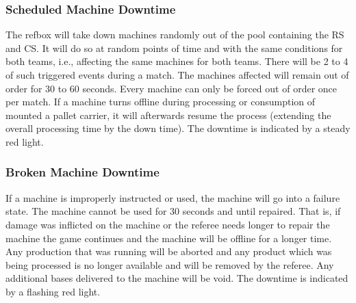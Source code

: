 \documentclass[12pt,twoside]{article}
\begin{document}
\subsubsection{Scheduled Machine Downtime}
\label{sec:out-of-order}
The refbox will take down machines randomly out of the pool containing
the RS and CS. It will do so at random points of time and with the
same conditions for both teams, i.e., affecting the same machines for
both teams. There will be 2 to 4 of such triggered events during a
match. The machines affected will remain out of order for 30 to 60
seconds. Every machine can only be forced out of order once per
match. If a machine turns offline during processing or consumption of
mounted a pallet carrier, it will afterwards resume the process
(extending the overall processing time by the down time). The downtime
is indicated by a steady red light.

\subsubsection{Broken Machine Downtime}
\label{sec:broken-machine}
If a machine is improperly instructed or used, the machine will go
into a failure state. The machine cannot be used for 30 seconds and
until repaired. That is, if damage was inflicted on the machine or the
referee needs longer to repair the machine the game continues and the
machine will be offline for a longer time. Any production that was
running will be aborted and any product which was being processed is
no longer available and will be removed by the referee. Any additional
bases delivered to the machine will be void. The downtime is indicated
by a flashing red light.
\end{document}
